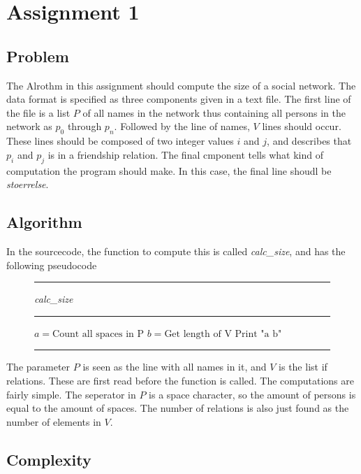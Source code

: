 \section{Assignment 1}

\subsection{Problem}

The Alrothm in this assignment should compute the size of a
social network. The data format is specified as
three components given in a text file. The first line of the file is
a list $P$ of all names in the network thus containing all
persons in the network as $p_0$ through $p_n$. Followed by the line of names, 
$V$ lines should occur. These lines should be composed of two integer 
values $i$ and $j$, and describes that $p_i$ and $p_j$ is in a friendship 
relation. The final cmponent tells what kind of computation the program should make.
In this case, the final line shoudl be \textit{stoerrelse}.


\subsection{Algorithm}

In the sourcecode, the function to compute this is called \textit{calc\_size},
and has the following pseudocode

\begin{figure}[ht]
\hrule
\vspace{0.2cm}
{\centering  \textit{calc\_size}}
\vspace{0.2cm}
\hrule
\begin{algorithmic}

\State $a = \text{Count all spaces in P}$
\State $b = \text{Get length of V}$
\State $\text{Print "a b"}$ 
\EndFunction
\end{algorithmic}
\hrule
\end{figure}

The parameter $P$ is seen as the line with all names in it, and
$V$ is the list if relations. These are first read before the 
function is called. The computations are fairly simple. The
seperator in $P$ is a space character, so the amount of 
persons is equal to the amount of spaces. The number of relations
is also just found as the number of elements in $V$.

\subsection{Complexity}

